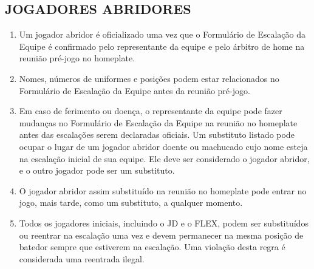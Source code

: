 \subsection{JOGADORES ABRIDORES}
\begin{enumerate}[label=(\alph*)]\item   Um jogador abridor é oficializado uma vez que o Formulário de Escalação da
	Equipe é confirmado pelo representante da equipe e pelo árbitro de \gls{home} na
	reunião pré-jogo no \gls{homeplate}.
	\item  Nomes, números de uniformes e posições podem estar relacionados no Formulário de Escalação da Equipe antes da reunião pré-jogo.
	\item  Em caso de ferimento ou doença, o representante da equipe pode fazer  mudanças no Formulário de Escalação da Equipe na reunião no \gls{homeplate}  antes das escalações serem declaradas oficiais. Um substituto listado pode  ocupar o lugar de um jogador abridor doente ou machucado cujo nome esteja na escalação inicial de sua equipe. Ele deve ser considerado o jogador abridor, e o outro jogador pode ser um substituto.
	\item  O jogador abridor assim substituído na reunião no \gls{homeplate} pode entrar no jogo, mais tarde, como um substituto, a qualquer momento.
	\item  Todos os jogadores iniciais, incluindo o JD e o FLEX, podem ser substituídos  ou reentrar na escalação uma vez e devem permanecer na mesma posição de  batedor sempre que estiverem na escalação. Uma violação desta regra é  considerada uma reentrada ilegal.
\end{enumerate}
